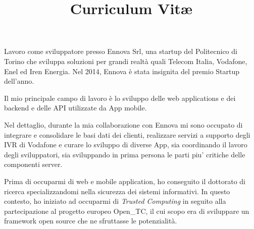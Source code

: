 \documentclass[a4paper,sans]{moderncv} %
\title{Curriculum Vit\ae}
\newcommand{\otc}{Open\_TC}
\begin{document}
\maketitle

\justify
Lavoro come sviluppatore presso Ennova Srl, una startup del Politecnico
di Torino che sviluppa soluzioni
per grandi realt\`a quali Telecom Italia, Vodafone, Enel ed Iren Energia.
Nel 2014, Ennova \`e stata insignita del premio Startup dell'anno.


Il mio principale campo di lavoro \`e lo sviluppo delle web applications e
dei backend e delle API utilizzate da App mobile.


    Nel dettaglio, durante la mia collaborazione con Ennova mi sono occupato
    di integrare e consolidare le basi dati dei clienti,
    realizzare servizi a supporto degli IVR di Vodafone
    e curare lo sviluppo di diverse App,
    sia coordinando il lavoro degli sviluppatori,
    sia sviluppando in prima persona le parti piu' critiche delle componenti server.

Prima di occuparmi di web e mobile application,
      ho conseguito il dottorato di ricerca specializzandomi nella sicurezza dei sistemi informativi.
      In questo contesto, ho iniziato ad occuparmi di \emph{Trusted Computing} in
      seguito alla partecipazione al progetto europeo \otc, il cui scopo era
      di sviluppare un framework open source che ne sfruttasse le potenzialit\`a.
\end{document}
